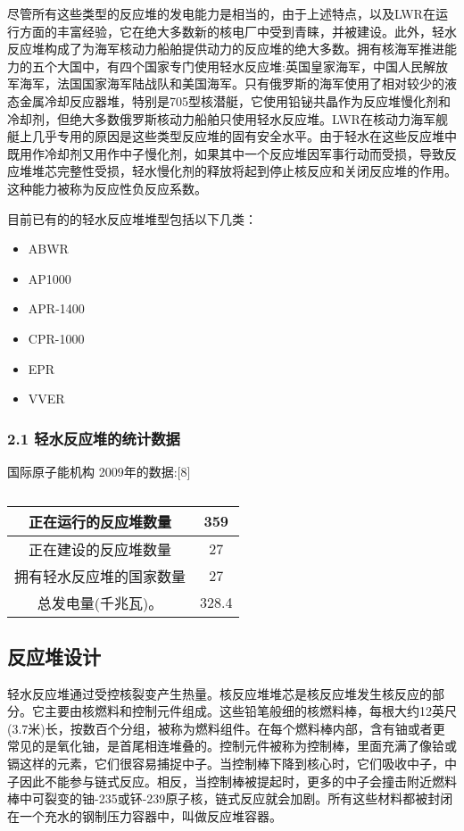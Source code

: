 尽管所有这些类型的反应堆的发电能力是相当的，由于上述特点，以及LWR在运行方面的丰富经验，它在绝大多数新的核电厂中受到青睐，并被建设。此外，轻水反应堆构成了为海军核动力船舶提供动力的反应堆的绝大多数。拥有核海军推进能力的五个大国中，有四个国家专门使用轻水反应堆:英国皇家海军，中国人民解放军海军，法国国家海军陆战队和美国海军。只有俄罗斯的海军使用了相对较少的液态金属冷却反应器堆，特别是705型核潜艇，它使用铅铋共晶作为反应堆慢化剂和冷却剂，但绝大多数俄罗斯核动力船舶只使用轻水反应堆。LWR在核动力海军舰艇上几乎专用的原因是这些类型反应堆的固有安全水平。由于轻水在这些反应堆中既用作冷却剂又用作中子慢化剂，如果其中一个反应堆因军事行动而受损，导致反应堆堆芯完整性受损，轻水慢化剂的释放将起到停止核反应和关闭反应堆的作用。这种能力被称为反应性负反应系数。

目前已有的的轻水反应堆堆型包括以下几类：
\begin{itemize}
\item ABWR
\item AP1000
\item APR-1400
\item CPR-1000
\item EPR
\item VVER
\end{itemize}

\subsubsection{2.1 轻水反应堆的统计数据}

国际原子能机构 2009年的数据:[8]
\begin{table}[ht]
\centering
\caption\label{QSFYD}
\begin{tabular}{|c|c}
\hline
正在运行的反应堆数量 & 359\\
\hline
正在建设的反应堆数量 & 27\\
\hline
拥有轻水反应堆的国家数量 & 27\\
\hline
总发电量(千兆瓦)。 & 328.4\\
\hline
\end{tabular}
\end{table}

\subsection{反应堆设计}
轻水反应堆通过受控核裂变产生热量。核反应堆堆芯是核反应堆发生核反应的部分。它主要由核燃料和控制元件组成。这些铅笔般细的核燃料棒，每根大约12英尺(3.7米)长，按数百个分组，被称为燃料组件。在每个燃料棒内部，含有铀或者更常见的是氧化铀，是首尾相连堆叠的。控制元件被称为控制棒，里面充满了像铪或镉这样的元素，它们很容易捕捉中子。当控制棒下降到核心时，它们吸收中子，中子因此不能参与链式反应。相反，当控制棒被提起时，更多的中子会撞击附近燃料棒中可裂变的铀-235或钚-239原子核，链式反应就会加剧。所有这些材料都被封闭在一个充水的钢制压力容器中，叫做反应堆容器。

